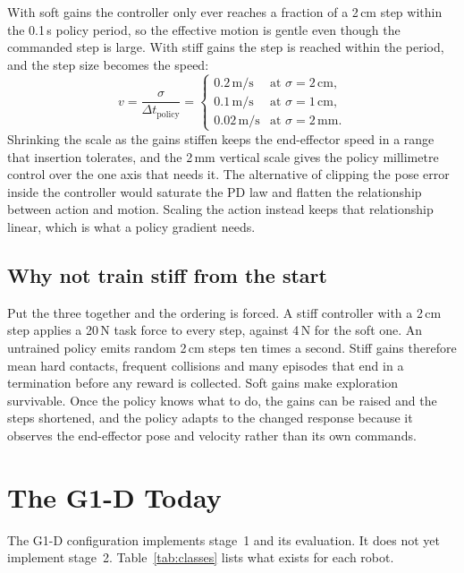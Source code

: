 With soft gains the controller only ever reaches a fraction of a 2\,cm step within the 0.1\,s policy period, so the effective motion is gentle even though the commanded step is large. With stiff gains the step is reached within the period, and the step size becomes the speed:
\begin{equation}
  v = \frac{\sigma}{\Delta t_{\mathrm{policy}}} =
  \begin{cases}
    0.2\,\mathrm{m/s} & \text{at } \sigma = 2\,\mathrm{cm},\\
    0.1\,\mathrm{m/s} & \text{at } \sigma = 1\,\mathrm{cm},\\
    0.02\,\mathrm{m/s} & \text{at } \sigma = 2\,\mathrm{mm}.
  \end{cases}
\end{equation}
Shrinking the scale as the gains stiffen keeps the end-effector speed in a range that insertion tolerates, and the 2\,mm vertical scale gives the policy millimetre control over the one axis that needs it. The alternative of clipping the pose error inside the controller would saturate the PD law and flatten the relationship between action and motion. Scaling the action instead keeps that relationship linear, which is what a policy gradient needs.

\subsection{Why not train stiff from the start}
\label{sec:whynot}

Put the three together and the ordering is forced. A stiff controller with a 2\,cm step applies a 20\,N task force to every step, against 4\,N for the soft one. An untrained policy emits random 2\,cm steps ten times a second. Stiff gains therefore mean hard contacts, frequent collisions and many episodes that end in a termination before any reward is collected. Soft gains make exploration survivable. Once the policy knows what to do, the gains can be raised and the steps shortened, and the policy adapts to the changed response because it observes the end-effector pose and velocity rather than its own commands.

\section{The G1-D Today}
\label{sec:g1d}

The G1-D configuration implements stage~1 and its evaluation. It does not yet implement stage~2. Table~\ref{tab:classes} lists what exists for each robot.

